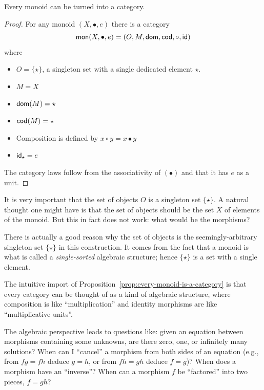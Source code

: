 \begin{construction} \label{prop:every-monoid-is-a-category}
  Every monoid can be turned into a category.
\end{construction}
\begin{proof}
  For any monoid \((X,\bullet,e)\) there is a category
  \[
    \mathsf{mon}(X,\bullet,e) = (O,M,\operatorname{\mathsf{dom}},\operatorname{\mathsf{cod}},\circ,\mathsf{id})
  \]
  where
  \begin{itemize}
  \item \(O = \{\star\}\), a singleton set with a single dedicated element \(\star\).
  \item \(M = X\)
  \item \(\operatorname{\mathsf{dom}}(M) = \star\)
  \item \(\operatorname{\mathsf{cod}}(M) = \star\)
  \item Composition is defined by \(x \circ y = x \bullet y\)
  \item \(\mathsf{id}_\star = e\)
  \end{itemize}
  The category laws follow from the associativity of \((\bullet)\)
  and that it has \(e\) as a unit.
\end{proof}
\begin{note}
  It is very important that the set of objects \(O\) is a singleton set \(\{\star\}\).
  A natural thought one might have is that the set of objects should be the set \(X\) of elements of the monoid.
  But this in fact does not work: what would be the morphisms?

  There is actually a good reason why the set of objects is the seemingly-arbitrary singleton set \(\{\star\}\) in this construction.
  It comes from the fact that a monoid is what is called a \emph{single-sorted} algebraic structure; hence \(\{\star\}\)
  is a set with a single element.
\end{note}
The intuitive import of
Proposition~\ref{prop:every-monoid-is-a-category} is that
every category can be thought of as a kind of algebraic structure,
where composition is like ``multiplication''
and identity morphisms are like ``multiplicative units''.

The algebraic perspective leads to questions like:
given an equation between morphisms containing some unknowns,
are there zero, one, or infinitely many solutions?
When can I ``cancel'' a morphism from both sides of an equation (e.g., from \(fg = fh\) deduce \(g=h\),
or from \(fh = gh\) deduce \(f=g\))?
When does a morphism have an ``inverse''?
When can a morphism \(f\) be ``factored'' into two pieces, \(f = gh\)?

